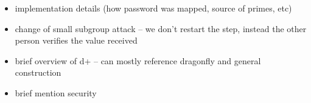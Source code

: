 

\begin{itemize}
    \item implementation details (how password was mapped, source of primes, etc)
    \item change of small subgroup attack -- we don't restart the step, instead the other person verifies the value received
    \item brief overview of d+ -- can mostly reference dragonfly and general construction
    \item brief mention security
\end{itemize}
